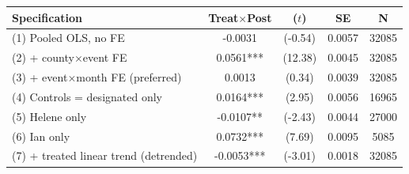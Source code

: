 \begin{tabular}{lcccc}
\toprule
Specification & Treat$\times$Post & ($t$) & SE & N \\
\midrule
(1) Pooled OLS, no FE & -0.0031 & (-0.54) & 0.0057 & 32085 \\
(2) + county$\times$event FE & 0.0561*** & (12.38) & 0.0045 & 32085 \\
(3) + event$\times$month FE (preferred) & 0.0013 & (0.34) & 0.0039 & 32085 \\
(4) Controls = designated only & 0.0164*** & (2.95) & 0.0056 & 16965 \\
(5) Helene only & -0.0107** & (-2.43) & 0.0044 & 27000 \\
(6) Ian only & 0.0732*** & (7.69) & 0.0095 & 5085 \\
(7) + treated linear trend (detrended) & -0.0053*** & (-3.01) & 0.0018 & 32085 \\
\bottomrule
\end{tabular}